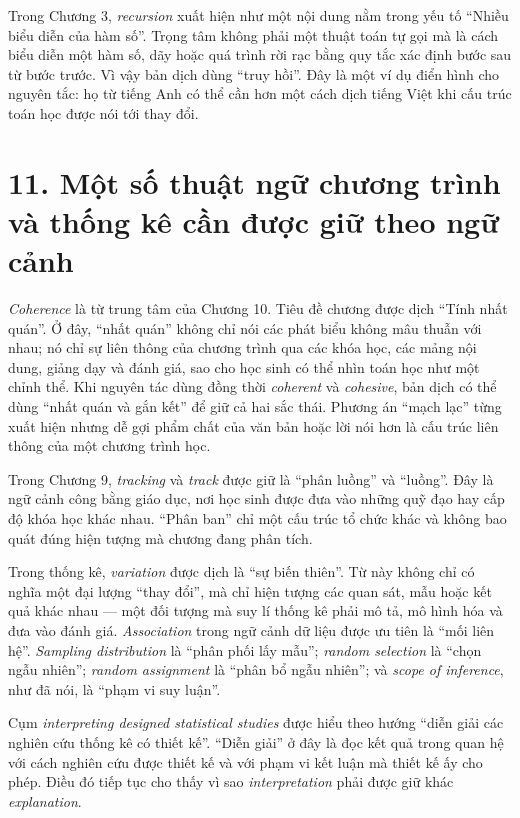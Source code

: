 Trong Chương 3, \emph{recursion} xuất hiện như một nội dung nằm trong yếu tố ``Nhiều biểu diễn của hàm số''. Trọng tâm không phải một thuật toán tự gọi mà là cách biểu diễn một hàm số, dãy hoặc quá trình rời rạc bằng quy tắc xác định bước sau từ bước trước. Vì vậy bản dịch dùng ``truy hồi''. Đây là một ví dụ điển hình cho nguyên tắc: họ từ tiếng Anh có thể cần hơn một cách dịch tiếng Việt khi cấu trúc toán học được nói tới thay đổi.

\section*{11. Một số thuật ngữ chương trình và thống kê cần được giữ theo ngữ cảnh}

\emph{Coherence} là từ trung tâm của Chương 10. Tiêu đề chương được dịch ``Tính nhất quán''. Ở đây, ``nhất quán'' không chỉ nói các phát biểu không mâu thuẫn với nhau; nó chỉ sự liên thông của chương trình qua các khóa học, các mảng nội dung, giảng dạy và đánh giá, sao cho học sinh có thể nhìn toán học như một chỉnh thể. Khi nguyên tác dùng đồng thời \emph{coherent} và \emph{cohesive}, bản dịch có thể dùng ``nhất quán và gắn kết'' để giữ cả hai sắc thái. Phương án ``mạch lạc'' từng xuất hiện nhưng dễ gợi phẩm chất của văn bản hoặc lời nói hơn là cấu trúc liên thông của một chương trình học.

Trong Chương 9, \emph{tracking} và \emph{track} được giữ là ``phân luồng'' và ``luồng''. Đây là ngữ cảnh công bằng giáo dục, nơi học sinh được đưa vào những quỹ đạo hay cấp độ khóa học khác nhau. ``Phân ban'' chỉ một cấu trúc tổ chức khác và không bao quát đúng hiện tượng mà chương đang phân tích.

Trong thống kê, \emph{variation} được dịch là ``sự biến thiên''. Từ này không chỉ có nghĩa một đại lượng ``thay đổi'', mà chỉ hiện tượng các quan sát, mẫu hoặc kết quả khác nhau --- một đối tượng mà suy lí thống kê phải mô tả, mô hình hóa và đưa vào đánh giá. \emph{Association} trong ngữ cảnh dữ liệu được ưu tiên là ``mối liên hệ''. \emph{Sampling distribution} là ``phân phối lấy mẫu''; \emph{random selection} là ``chọn ngẫu nhiên''; \emph{random assignment} là ``phân bổ ngẫu nhiên''; và \emph{scope of inference}, như đã nói, là ``phạm vi suy luận''.

Cụm \emph{interpreting designed statistical studies} được hiểu theo hướng ``diễn giải các nghiên cứu thống kê có thiết kế''. ``Diễn giải'' ở đây là đọc kết quả trong quan hệ với cách nghiên cứu được thiết kế và với phạm vi kết luận mà thiết kế ấy cho phép. Điều đó tiếp tục cho thấy vì sao \emph{interpretation} phải được giữ khác \emph{explanation}.

